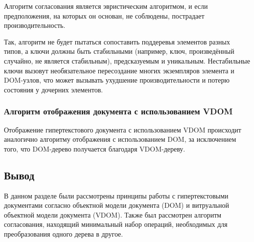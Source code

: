 
Алгоритм согласования является эвристическим алгоритмом, и если предположения, на которых он основан, не соблюдены, пострадает производительность.

Так, алгоритм не будет пытаться сопоставить поддеревья элементов разных типов, а ключи должны быть стабильными (например, ключ, произведённый случайно, не является стабильным), предсказуемым и уникальным.
Нестабильные ключи вызовут необязательное пересоздание многих экземпляров элемента и DOM-узлов, что может вызывать ухудшение производительности и потерю состояния у дочерних элементов.
\clearpage

\subsubsection{Алгоритм отображения документа с использованием VDOM}

Отображение гипертекстового документа с использованием VDOM происходит аналогично алгоритму отображения с использованием DOM, за исключением того, что DOM-дерево получается благодаря VDOM-дереву.

\subsection*{Вывод}

В данном разделе были рассмотрены принципы работы с гипертекстовыми документами согласно объектной модели документа (DOM) и витруальной объектной модели документа (VDOM).
Также был рассмотрен алгоритм согласования, находящий минимальный набор операций, необходимых для преобразования одного дерева в другое.